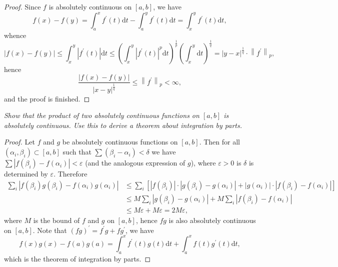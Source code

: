 \begin{proof}
Since $f$ is absolutely continuous on $[a,b]$, we have 
$$
f\left( x \right) -f\left( y \right) =\int_a^x{f^{\prime}\left( t \right) \mathrm{d}t}-\int_a^y{f^{\prime}\left( t \right) \mathrm{d}t}=\int_x^y{f^{\prime}\left( t \right) \mathrm{d}t},
$$
whence 
$$
\left| f\left( x \right) -f\left( y \right) \right|\le \int_x^y{\left| f^{\prime}\left( t \right) \right|\mathrm{d}t}\le \left( \int_x^y{\left| f^{\prime}\left( t \right) \right|^p\mathrm{d}t} \right) ^{\frac{1}{p}}\left( \int_x^y{\mathrm{d}t} \right) ^{\frac{1}{q}}=\left| y-x \right|^{\frac{1}{q}}\cdot \left\| f^{\prime} \right\| _p,
$$
hence 
$$
\frac{\left| f\left( x \right) -f\left( y \right) \right|}{\left| x-y \right|^{\frac{1}{q}}}\le \left\| f^{\prime} \right\| _p<\infty ,
$$
and the proof is finished.
\end{proof}
\begin{problem}\em
Show that the product of two absolutely continuous functions on $[a,b]$ is absolutely continuous. Use this to derive a theorem about integration by parts.
\end{problem}
\begin{proof}
Let $f$ and $g$ be absolutely continuous functions on $[a,b]$. Then for all $(\alpha_i,\beta_i)\subset[a,b]$ such that $\sum(\beta_i-\alpha_i)<\delta$ we have $\sum|f(\beta_i)-f(\alpha_i)|<\varepsilon$ (and the analogous expression of $g$), where $\varepsilon>0$ is $\delta$ is determined by $\varepsilon$. Therefore 
$$
\begin{aligned}
\sum_i{\left| f\left( \beta _i \right) g\left( \beta _i \right) -f\left( \alpha _i \right) g\left( \alpha _i \right) \right|}&\le \sum_i{\left[ \left| f\left( \beta _i \right) \right|\cdot \left| g\left( \beta _i \right) -g\left( \alpha _i \right) \right|+\left| g\left( \alpha _i \right) \right|\cdot \left| f\left( \beta _i \right) -f\left( \alpha _i \right) \right| \right]}
\\
&\le M\sum_i{\left| g\left( \beta _i \right) -g\left( \alpha _i \right) \right|}+M\sum_i{\left| f\left( \beta _i \right) -f\left( \alpha _i \right) \right|}
\\
&\le M\varepsilon +M\varepsilon =2M\varepsilon ,
\end{aligned}
$$
where $M$ is the bound of $f$ and $g$ on $[a,b]$, hence $fg$ is also absolutely continuous on $[a,b]$. Note that $(fg)^\prime=f^\prime g+fg^\prime$, we have 
$$
f\left( x \right) g\left( x \right) -f\left( a \right) g\left( a \right) =\int_a^x{f^{\prime}\left( t \right) g\left( t \right) \mathrm{d}t}+\int_a^x{f\left( t \right) g^{\prime}\left( t \right) \mathrm{d}t},
$$
which is the theorem of integration by parts.
\end{proof}
